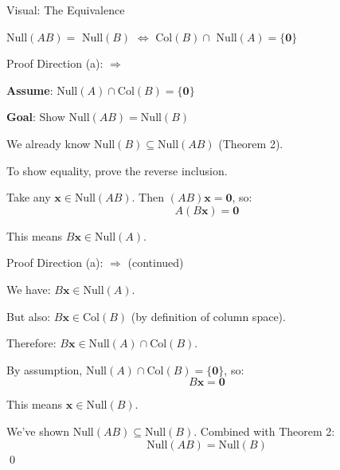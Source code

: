 \documentclass[10pt]{beamer}
\theoremstyle{definition}
\newcommand{\x}[1]{\alert{\textbf{#1}}}
\begin{document}
\begin{frame}[fragile]{Visual: The Equivalence}
\begin{center}
\end{center}

\vspace{-0.3em}

Null$(AB) =$ Null$(B)$ $\Longleftrightarrow$ Col$(B) \cap$ Null$(A) = \{\mathbf{0}\}$

\end{frame}

\begin{frame}{Proof Direction (a): $\Rightarrow$}

\x{Assume}: $\text{Null}(A) \cap \text{Col}(B) = \{\mathbf{0}\}$

\x{Goal}: Show $\text{Null}(AB) = \text{Null}(B)$

\vspace{1em}

We already know $\text{Null}(B) \subseteq \text{Null}(AB)$ (Theorem 2).

To show equality, prove the reverse inclusion.

\vspace{1em}

Take any $\mathbf{x} \in \text{Null}(AB)$. Then $(AB)\mathbf{x} = \mathbf{0}$, so:
$$A(B\mathbf{x}) = \mathbf{0}$$

This means $B\mathbf{x} \in \text{Null}(A)$.

\end{frame}

\begin{frame}{Proof Direction (a): $\Rightarrow$ (continued)}

We have: $B\mathbf{x} \in \text{Null}(A)$.

\vspace{1em}

But also: $B\mathbf{x} \in \text{Col}(B)$ (by definition of column space).

\vspace{1em}

Therefore: $B\mathbf{x} \in \text{Null}(A) \cap \text{Col}(B)$.

\vspace{1em}

By assumption, $\text{Null}(A) \cap \text{Col}(B) = \{\mathbf{0}\}$, so:
$$B\mathbf{x} = \mathbf{0}$$

\vspace{1em}

This means $\mathbf{x} \in \text{Null}(B)$.

\vspace{1em}

We've shown $\text{Null}(AB) \subseteq \text{Null}(B)$. Combined with Theorem 2:
$$\text{Null}(AB) = \text{Null}(B)$$ \qed

\end{frame}
\end{document}
